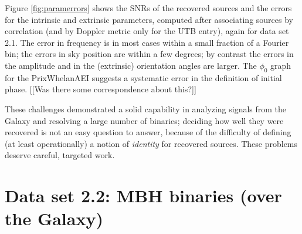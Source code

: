 \documentclass{iopart}
\begin{document}
Figure \ref{fig:paramerrors} shows the SNRs of the recovered sources and the errors for the intrinsic and extrinsic parameters, computed after associating sources by correlation (and by Doppler metric only for the UTB entry), again for data set 2.1. The error in frequency is in most cases within a small fraction of a Fourier bin; the errors in sky position are within a few degrees; by contrast the errors in the amplitude and in the (extrinsic) orientation angles are larger. The $\phi_0$ graph for the PrixWhelanAEI suggests a systematic error in the definition of initial phase. [[Was there some correspondence about this?]]

These challenges demonstrated a solid capability in analyzing signals from the Galaxy and resolving a large number of binaries; deciding how well they were recovered is not an easy question to answer, because of the difficulty of defining (at least operationally) a notion of \emph{identity} for recovered sources. These problems deserve careful, targeted work.

\section{Data set 2.2: MBH binaries (over the Galaxy)}
\end{document}
